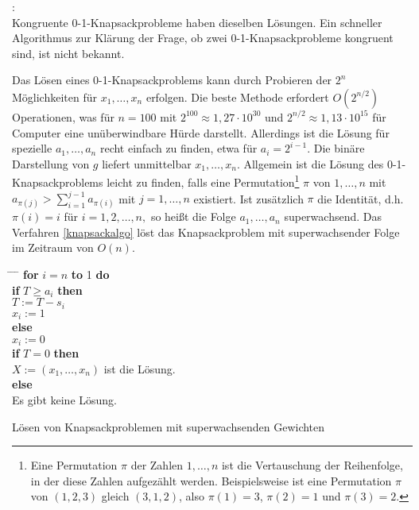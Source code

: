 \begin{refsegment}
\begin{enumerate}
\end{enumerate}

\begin{remark}{:}\\
Kongruente 0-1-Knapsackprobleme haben dieselben Lösungen.
Ein schneller Algorithmus zur Klärung der Frage, ob zwei 0-1-Knapsackprobleme kongruent sind, ist nicht bekannt.
\end{remark}

Das Lösen eines 0-1-Knapsackproblems kann durch Probieren der $ 2^n $   Möglichkeiten für $ x_1, \dots, x_n $   erfolgen. Die beste Methode erfordert $ O(2^{n/2}) $  Operationen, was für $ n=100 $  mit $ 2^{100} \approx 1,27 \cdot 10^{30} $  und  $ 2^{n/2} \approx 1,13 \cdot 10^{15} $ für Computer eine unüberwindbare Hürde darstellt.
Allerdings ist die Lösung für spezielle $ a_1, \dots, a_n $   recht einfach zu finden, etwa für $ a_i = 2^{i-1}. $  Die binäre Darstellung von $ g $ liefert unmittelbar $ x_1, \dots, x_n$. Allgemein ist die Lösung des 0-1-Knapsackproblems leicht zu finden, falls eine  Permutation\footnote{%
  Eine Permutation $\pi$ der Zahlen $1, \dots, n$ ist die
  Vertauschung der Reihenfolge, in der diese Zahlen aufgezählt werden.
  Beispielsweise ist eine Permutation $\pi$ von $(1,2,3)$ gleich $(3,1,2)$,
  also $\pi(1) = 3$, $\pi(2) = 1$ und $\pi(3) = 2$.
}
$ \pi $  von $ 1, \dots, n $  mit $ a_{\pi (j)} > \sum_{i=1}^{j-1} a_{\pi(i)} $
mit $ j =  1, \dots, n $ existiert.
Ist zusätzlich $ \pi $ die Identität, d.h. $ \pi(i)=i $ für $ i=1,2,\dots,n, $ so heißt die Folge $ a_1, \dots , a_n $ superwachsend.
Das Verfahren \ref{knapsackalgo} löst das Knapsackproblem mit superwachsender Folge im Zeitraum von $ O(n). $
\begin{cryptoprocedure}
\begin{tabbing}
\hspace*{0.5cm} \= \hspace*{0.5cm} \= \hspace*{0.5cm} \= \kill
\>\textbf{for} $ i=n $ \textbf{to} 1 \textbf{do}\\
\>\> \textbf{if} $ T\geq a_i $ \textbf{then}\\
\>\> \> $ T:=T-s_i $\\
\>\>\> $ x_i:=1 $\\
\>\> \textbf{else}\\
\>\>\> $ x_i:=0 $\\
\>\textbf{if} $ T=0 $ \textbf{then}\\
\>\> $ X:=(x_1, \dots, x_n) $ ist die Lösung.\\
\>\textbf{else}\\
\>\> Es gibt keine Lösung.
\end{tabbing}
\caption{Lösen von Knapsackproblemen mit superwachsenden Gewichten}
\label{knapsackalgo}
\end{cryptoprocedure}



\end{refsegment}
